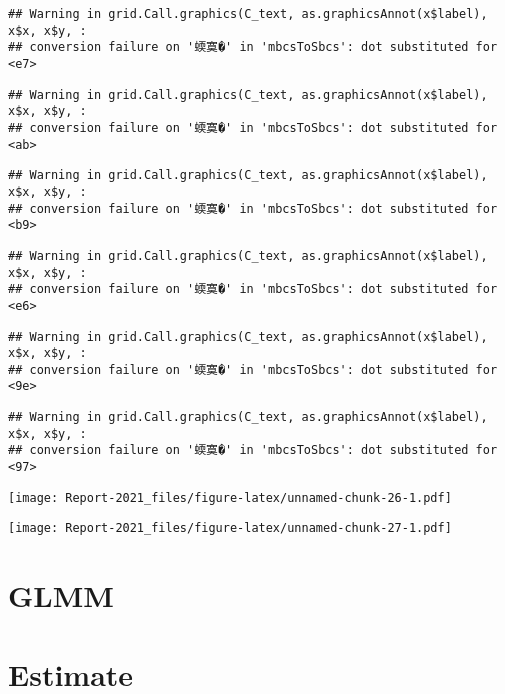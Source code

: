 \documentclass[
]{article}
\begin{document}
\begin{verbatim}
## Warning in grid.Call.graphics(C_text, as.graphicsAnnot(x$label), x$x, x$y, :
## conversion failure on '蝡寞�' in 'mbcsToSbcs': dot substituted for <e7>
\end{verbatim}

\begin{verbatim}
## Warning in grid.Call.graphics(C_text, as.graphicsAnnot(x$label), x$x, x$y, :
## conversion failure on '蝡寞�' in 'mbcsToSbcs': dot substituted for <ab>
\end{verbatim}

\begin{verbatim}
## Warning in grid.Call.graphics(C_text, as.graphicsAnnot(x$label), x$x, x$y, :
## conversion failure on '蝡寞�' in 'mbcsToSbcs': dot substituted for <b9>
\end{verbatim}

\begin{verbatim}
## Warning in grid.Call.graphics(C_text, as.graphicsAnnot(x$label), x$x, x$y, :
## conversion failure on '蝡寞�' in 'mbcsToSbcs': dot substituted for <e6>
\end{verbatim}

\begin{verbatim}
## Warning in grid.Call.graphics(C_text, as.graphicsAnnot(x$label), x$x, x$y, :
## conversion failure on '蝡寞�' in 'mbcsToSbcs': dot substituted for <9e>
\end{verbatim}

\begin{verbatim}
## Warning in grid.Call.graphics(C_text, as.graphicsAnnot(x$label), x$x, x$y, :
## conversion failure on '蝡寞�' in 'mbcsToSbcs': dot substituted for <97>
\end{verbatim}

\texttt{[image: Report-2021\_files/figure-latex/unnamed-chunk-26-1.pdf]}

\texttt{[image: Report-2021\_files/figure-latex/unnamed-chunk-27-1.pdf]}

\newpage

\hypertarget{glmm}{%
\section{GLMM}\label{glmm}}

\newpage

\hypertarget{estimate}{%
\section{Estimate}\label{estimate}}
\end{document}
